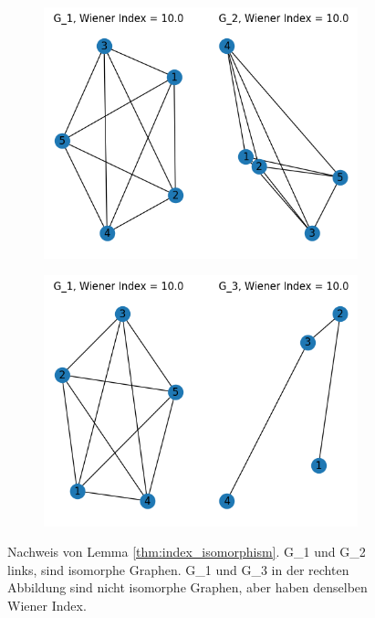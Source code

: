 \begin{figure}[H]
    \begin{subfigure}{.4\textwidth}
        \includegraphics[width=\textwidth]{images/20_material_methods/lemma_2_proof_1.png}
        \label{fig:lemma_proof_1}
    \end{subfigure}%
    \hfill
    \vline
    \hfill
    \begin{subfigure}{.4\textwidth}
        \includegraphics[width=\textwidth]{images/20_material_methods/lemma_2_proof_2.png}
        \label{fig:lemma_proof_2}
    \end{subfigure}
    \caption{Nachweis von Lemma \ref{thm:index_isomorphism}. G\_1 und G\_2 links, sind isomorphe Graphen. G\_1 und G\_3 in der rechten Abbildung sind nicht isomorphe Graphen, aber haben denselben Wiener Index.}
\end{figure}

